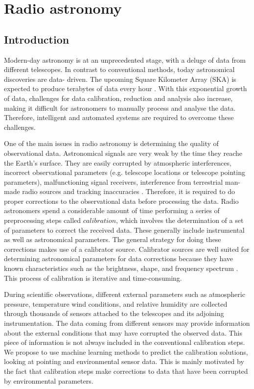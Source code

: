 \chapter{Radio astronomy}

\section{Introduction}


Modern-day astronomy is at an unprecedented stage, with a deluge of data from different telescopes. In contrast
to conventional methods, today astronomical discoveries are data- driven. The upcoming Square Kilometer Array (SKA) is expected to produce terabytes of data every hour \citep{skatelescope}. With this exponential growth of data, challenges for data calibration, reduction and analysis also increase, making it difficult for astronomers to manually process and analyse the data. Therefore, intelligent and automated systems are required  to overcome these challenges.

One of the main issues in radio astronomy is determining the quality of observational data. Astronomical signals are very weak  by the time they reache the Earth’s surface. They are easily corrupted by atmospheric interferences, incorrect observational parameters (e.g. telescope locations or telescope pointing parameters), malfunctioning signal receivers, interference from terrestrial man-made radio sources and tracking inaccuracies \citep{taylor1999synthesis}. Therefore, it is required to do proper corrections to the observational data before processing the data. Radio astronomers spend a considerable amount of time performing a series of preprocessing steps called $\textit{calibration}$, which involves the determination of a set of parameters to correct the received data. These generally include instrumental as well as astronomical parameters. The general strategy for doing these corrections makes use of a calibrator source. Calibrator sources are well suited for determining astronomical parameters for data corrections because they have known characteristics such as the brightness, shape, and frequency spectrum \citep{taylor1999synthesis}. This process of calibration is iterative and time-consuming.

During scientific observations, different external parameters such as atmospheric pressure, temperature  wind conditions, and relative humidity  are collected through thousands of sensors attached to the telescopes and its adjoining instrumentation. The data coming from different sensors may provide information about the external conditions that may have corrupted the observed data. This piece of information is not always included in the conventional calibration steps. We propose to use machine learning methods to predict the calibration solutions, looking at pointing and environmental sensor data. This is mainly motivated by the fact that calibration steps make corrections to data that have been corrupted by environmental parameters.

